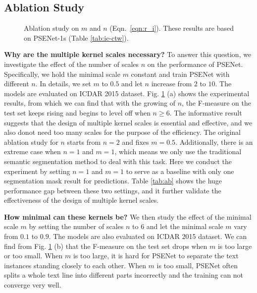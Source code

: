\documentclass{article}
\begin{document}
\subsection{Ablation Study}

\begin{figure}[t]
  \centering
  \setlength{\fboxrule}{0pt}
  \vspace{-8pt}
  \caption{Ablation study on $m$ and $n$ (Eqn.~\eqref{eqn:r_i}). These results are based on PSENet-1s (Table \ref{tab:ic-ctw}).}
  \label{fig:abs}
\end{figure}

\textbf{Why are the multiple kernel scales necessary?} To answer this question, we investigate the effect of the number of scales $n$ on the performance of PSENet. Specifically, we hold the minimal scale $m$ constant and train PSENet with different $n$. In details, we set $m$ to $0.5$ and let $n$ increase from $2$ to $10$. The models are evaluated on ICDAR 2015 dataset. Fig. \ref{fig:abs} (a) shows the experimental results, from which we can find that with the growing of $n$, the F-measure on the test set keeps rising and begins to level off when $n \ge 6$. The informative result suggests that the design of multiple kernel scales is essential and effective, and we also donot need too many scales for the purpose of the efficiency. The original ablation study for $n$ starts from $n = 2$ and fixes $m = 0.5$. Additionally, there is an extreme case when $n = 1$ and $m = 1$, which means we only use the traditional semantic segmentation method to deal with this task. Here we conduct the experiment by setting $n = 1$ and $m = 1$ to serve as a baseline with only one segmentation mask result for predictions. Table \ref{tab:ab} shows the huge performance gap between these two settings, and it further validate the effectiveness of the design of multiple kernel scales.

\textbf{How minimal can these kernels be?} We then study the effect of the minimal scale $m$ by setting the number of scales $n$ to $6$ and let the minimal scale $m$ vary from $0.1$ to $0.9$. The models are also evaluated on ICDAR 2015 dataset. We can find from Fig. \ref{fig:abs} (b) that the F-measure on the test set drops when $m$ is too large or too small. When $m$ is too large, it is hard for PSENet to separate the text instances standing closely to each other. When $m$ is too small, PSENet often splits a whole text line into different parts incorrectly and the training can not converge very well. 
\end{document}
